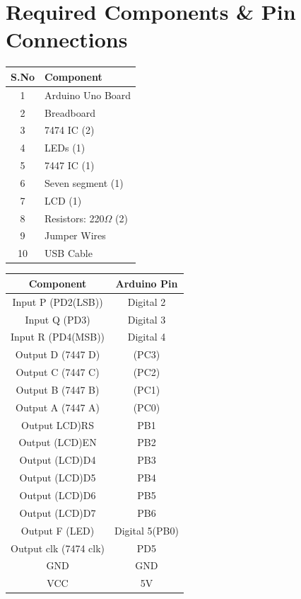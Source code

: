 \documentclass[a4paper,12pt]{article}
\begin{document}
\section*{Required Components \& Pin Connections}
\begin{center}
\begin{minipage}{0.45\textwidth}
\begin{table}[H]
\centering
\begin{tabular}{|c|l|}
\hline
\textbf{S.No} & \textbf{Component} \\ \hline
1 & Arduino Uno Board \\
2 & Breadboard \\
3 & 7474 IC (2) \\
4 & LEDs (1) \\
5 & 7447 IC (1) \\
6 & Seven segment (1) \\
7 & LCD (1)\\
8 & Resistors: 220$\Omega$ (2) \\
9 & Jumper Wires \\
10 & USB Cable \\
\hline
\end{tabular}
\end{table}
\end{minipage}
\hspace{0.05\textwidth}
\begin{minipage}{0.45\textwidth}
\begin{table}[H]
\centering
\begin{tabular}{|c|c|}
\hline
\textbf{Component} & \textbf{Arduino Pin} \\ \hline
Input P (PD2(LSB)) & Digital 2 \\
Input Q (PD3) & Digital 3 \\
Input R (PD4(MSB)) & Digital 4 \\
Output D (7447 D) & (PC3)\\
Output C (7447 C) & (PC2)\\
Output B (7447 B) & (PC1) \\
Output A (7447 A) & (PC0)\\
Output LCD)RS & PB1\\
Output (LCD)EN & PB2\\
Output (LCD)D4 & PB3\\
Output (LCD)D5 & PB4\\
Output (LCD)D6 & PB5\\
Output (LCD)D7 & PB6\\
Output F (LED) & Digital 5(PB0) \\
Output clk (7474 clk) & PD5 \\
GND & GND \\
VCC & 5V \\
\hline
\end{tabular}
\end{table}
\end{minipage}
\end{center}
\end{document}
